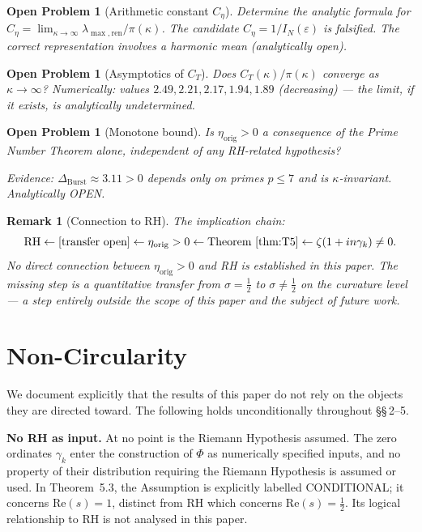 \documentclass[11pt]{article}
\newtheorem*{remark}{Remark}
\newtheorem{openproblem}[theorem]{Open Problem}
\newcommand{\etaorig}{\eta_{\mathrm{orig}}}
\newcommand{\Ceta}{C_{\eta}}
\newcommand{\CT}{C_{T}}
\newcommand{\Dburstvar}{\Delta_{\mathrm{Burst}}}
\begin{document}
\begin{openproblem}[Arithmetic constant $\Ceta$]\label{op:ceta}
Determine the analytic formula for
$\Ceta = \lim_{\kappa\to\infty}\lambda_{\max,\mathrm{ren}}/\pi(\kappa)$.
The candidate $\Ceta = 1/I_N(\varepsilon)$ is falsified.
The correct representation involves a harmonic mean
(analytically open).
\end{openproblem}

\begin{openproblem}[Asymptotics of $\CT$]\label{op:ct}
Does $\CT(\kappa)/\pi(\kappa)$ converge as $\kappa\to\infty$?
Numerically: values $2.49, 2.21, 2.17, 1.94, 1.89$ (decreasing) ---
the limit, if it exists, is analytically undetermined.
\end{openproblem}

\begin{openproblem}[Monotone bound]\label{op:mono}
Is $\etaorig > 0$ a consequence of the Prime Number Theorem alone,
independent of any RH-related hypothesis?

Evidence: $\Dburstvar\approx 3.11 > 0$ depends only on primes
$p\leq 7$ and is $\kappa$-invariant.
Analytically OPEN.
\end{openproblem}

\begin{remark}[Connection to RH]
The implication chain:
\[
\mathrm{RH} \leftarrow
[\text{transfer open}]
\leftarrow \etaorig > 0
\leftarrow \text{Theorem~\ref{thm:T5}}
\leftarrow \zeta(1+in\gamma_k)\neq 0.
\]
No direct connection between $\etaorig > 0$ and RH is established
in this paper. The missing step is a quantitative transfer from
$\sigma=\tfrac{1}{2}$ to $\sigma\neq\tfrac{1}{2}$ on the curvature level
--- a step entirely outside the scope of this paper and the subject of
future work.
\end{remark}

\section{Non-Circularity}
\label{sec:nocirc}

We document explicitly that the results of this paper do not rely on
the objects they are directed toward. The following holds unconditionally
throughout \S\S\,2--5.

\textbf{No RH as input.}
At no point is the Riemann Hypothesis assumed. The zero ordinates
$\gamma_k$ enter the construction of $\Phi$ as numerically specified
inputs, and no property of their distribution requiring the Riemann
Hypothesis is assumed or used. In Theorem~5.3, the Assumption is
explicitly labelled CONDITIONAL; it concerns $\mathrm{Re}(s)=1$,
distinct from RH which concerns $\mathrm{Re}(s)=\tfrac12$. Its
logical relationship to RH is not analysed in this paper.
\end{document}

